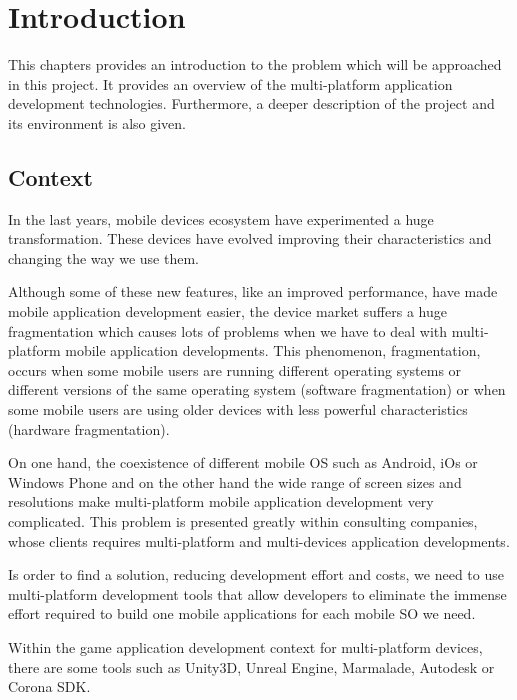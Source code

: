 \cleardoublepage
\chapter{Introduction}

\begin{chapterintro}

This chapters provides an introduction to the problem which will be approached in this project. It provides an overview of the multi-platform application development technologies. Furthermore, a deeper description of the project and its environment is also given.

\end{chapterintro}

\cleardoublepage
\section{Context}

In the last years, mobile devices ecosystem have experimented a huge transformation. These devices have evolved improving their characteristics and changing the way we use them.

Although some of these new features, like an improved performance, have made mobile application development easier, the device market suffers a huge fragmentation which causes lots of problems when we have to deal with multi-platform mobile application developments. This phenomenon, fragmentation, occurs when some mobile users are running different operating systems or different versions of the same operating system (software fragmentation) or when some mobile users are using older devices with less powerful characteristics (hardware fragmentation).

On one hand, the coexistence of different mobile OS such as Android, iOs or Windows Phone and on the other hand the wide range of screen sizes and resolutions make multi-platform mobile application development very complicated. This problem is presented greatly within consulting companies, whose clients requires multi-platform and multi-devices application developments.

Is order to find a solution, reducing development effort and costs, we need to use multi-platform development tools that allow developers to eliminate the immense effort required to build one mobile applications for each mobile SO we need.

Within the game application development context for multi-platform devices, there are some tools such as Unity3D, Unreal Engine, Marmalade, Autodesk or Corona SDK.

